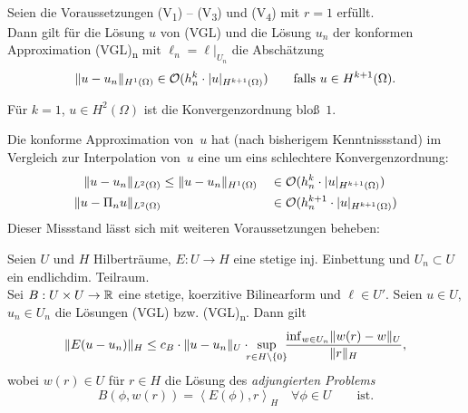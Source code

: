 \documentclass{cheat-sheet}
\newcommand{\tss}[1]{\textsubscript{#1}} %
\renewcommand{\O}{\mathcal{O}} %
\newcommand{\scp}[2]{\left\langle #1 , #2 \right\rangle} %
\begin{document}
\begin{satz} \mbox{} \\
  Seien die Voraussetzungen (V\tss{1}) -- (V\tss{3}) und (V\tss{4}) mit $r = 1$ erfüllt. \\
  Dann gilt für die Lösung $u$ von (VGL) und die Lösung $u_n$ der konformen Approximation (VGL)\tss{n} mit $\ell_n = \ell|_{U_n}$ die Abschätzung
  \[
    \norm{u - u_n}_{H^1(\Omega)} \in \O(h_n^k \cdot \abs{u}_{H^{k+1}(\Omega)}) \qquad
    \text{falls $u \in H^{k+1}(\Omega)$.}
  \]
\end{satz}

\begin{bsp}
  Für $k=1$, $u \in H^2(\Omega)$ ist die Konvergenzordnung bloß~$1$.
\end{bsp}

\begin{bem}
  Die konforme Approximation von~$u$ hat (nach bisherigem Kenntnissstand) im Vergleich zur Interpolation von~$u$ eine um eins schlechtere Konvergenzordnung:
  \begin{alignat*}{3}
    \norm{u - u_n}_{L^2(\Omega)} & \leq \norm{u - u_n}_{H^1(\Omega)} && \in \O(h_n^k \cdot \abs{u}_{H^{k+1}(\Omega)}) \\
    \norm{u - \Pi_n u}_{L^2(\Omega)} &&& \in \O(h_n^{k+1} \cdot \abs{u}_{H^{k+1}(\Omega)})
  \end{alignat*}
  Dieser Missstand lässt sich mit weiteren Voraussetzungen beheben:
\end{bem}

\begin{lem}
  Seien $U$ und $H$ Hilberträume, $E : U \to H$ eine stetige inj. Einbettung und $U_n \subset U$ ein endlichdim. Teilraum. \\
  Sei $B : U \times U \to \mathbb{R}$ eine stetige, koerzitive Bilinearform und $\ell \in U'$.
  Seien $u \in U$, $u_n \in U_n$ die Lösungen (VGL) bzw. (VGL)\tss{n}.
  Dann gilt
  \[
    \norm{E (u - u_n)}_H \leq c_B \cdot \norm{u - u_n}_{U} \cdot \enspace \sup_{\mathclap{r \in H \setminus \{ 0 \}}} \enspace \frac{\inf_{w \in U_n} \norm{w(r) - w}_U}{\norm{r}_H},
  \]
  wobei $w(r) \in U$ für $r \in H$ die Lösung des \emph{adjungierten Problems}
  \[
    B(\phi, w(r)) = \scp{E(\phi)}{r}_H \quad \forall \phi \in U \qquad
    \text{ist.}
  \]
\end{lem}
\end{document}
